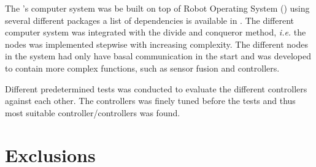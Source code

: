 The \abbrROV's computer system was be built on top of Robot Operating System (\abbrROS) using several different packages a list of dependencies is available in . The different computer system was integrated with the divide and conqueror method, \textit{i.e.} the nodes was implemented stepwise with increasing complexity. The different nodes in the system had only have basal communication in the start and was developed to contain more complex functions, such as sensor fusion and controllers. 

Different predetermined tests was conducted to evaluate the different controllers against each other. The controllers was finely tuned before the tests and thus most suitable controller/controllers was found.


\section{Exclusions}
